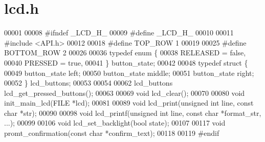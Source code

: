 \section{lcd.\+h}
\label{lcd_8h_source}

\begin{DoxyCode}
00001 
00008 \textcolor{preprocessor}{#ifndef \_LCD\_H\_}
00009 \textcolor{preprocessor}{#define \_LCD\_H\_}
00010 
00011 \textcolor{preprocessor}{#include <API.h>}
00012 
00018 \textcolor{preprocessor}{#define TOP\_ROW 1}
00019 
00025 \textcolor{preprocessor}{#define BOTTOM\_ROW 2}
00026 
00036 \textcolor{keyword}{typedef} \textcolor{keyword}{enum} \{
00038   RELEASED = \textcolor{keyword}{false},
00040   PRESSED = \textcolor{keyword}{true},
00041 \} button_state;
00042 
00048 \textcolor{keyword}{typedef} \textcolor{keyword}{struct }\{
00049   button_state left;
00050   button_state middle;
00051   button_state right;
00052 \} lcd_buttons;
00053 
00054 
00062 lcd_buttons lcd_get_pressed_buttons();
00063 
00069 \textcolor{keywordtype}{void} lcd_clear();
00070 
00080 \textcolor{keywordtype}{void} init_main_lcd(FILE *lcd);
00081 
00089 \textcolor{keywordtype}{void} lcd_print(\textcolor{keywordtype}{unsigned} \textcolor{keywordtype}{int} line, \textcolor{keyword}{const} \textcolor{keywordtype}{char} *str);
00090 
00098 \textcolor{keywordtype}{void} lcd_printf(\textcolor{keywordtype}{unsigned} \textcolor{keywordtype}{int} line, \textcolor{keyword}{const} \textcolor{keywordtype}{char} *format\_str, ...);
00099 
00106 \textcolor{keywordtype}{void} lcd_set_backlight(\textcolor{keywordtype}{bool} state);
00107 
00117 \textcolor{keywordtype}{void} promt_confirmation(\textcolor{keyword}{const} \textcolor{keywordtype}{char} *confirm\_text);
00118 
00119 \textcolor{preprocessor}{#endif}
\end{DoxyCode}

